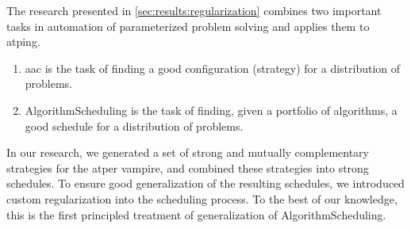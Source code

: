 The research presented in \cref{sec:results:regularization} combines two important tasks in automation of parameterized problem solving and applies them to \gls{atping}.
\begin{enumerate}
\item \Gls{aac} is the task of finding a good configuration (strategy) for a distribution of problems.
\item \Gls{AlgorithmScheduling} is the task of finding, given a portfolio of algorithms, a good schedule for a distribution of problems.
\end{enumerate}
In our research, we generated a set of strong and mutually complementary strategies for the \gls{atper} \gls{vampire},
and combined these strategies into strong schedules.
To ensure good generalization of the resulting schedules, we introduced custom regularization into the scheduling process.
To the best of our knowledge, this is the first principled treatment of generalization of \gls{AlgorithmScheduling}.
